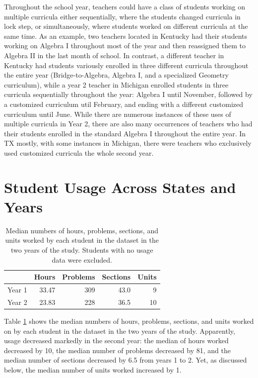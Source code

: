 \documentclass[12pt]{article}\usepackage[]{graphicx}\usepackage[]{color}
\begin{document}
Throughout the school year, teachers could have a class of students
working on multiple curricula either sequentially, where the students
changed curricula in lock step, or simultaneously, where students
worked on different curricula at the same time. As an example, two
teachers located in Kentucky had their students working on Algebra I
throughout most of the year and then reassigned them to Algebra II in
the last month of school. In contrast, a different teacher in Kentucky had students variously
enrolled in three different curricula throughout the entire year
(Bridge-to-Algebra, Algebra I, and a specialized Geometry curriculum),
while a year 2 teacher in Michigan enrolled students in
three curricula sequentially throughout the year: Algebra I
until November, followed by a customized curriculum util February, and
ending with a different customized curriculum until June. While there are numerous instances of these
uses of multiple curricula in Year 2, there are also many occurrences
of teachers who had their students enrolled in the standard Algebra I
throughout the entire year.  In TX mostly, with some instances in Michigan,
there were teachers who exclusively used customized curricula the
whole second year.

\section{Student Usage Across States and Years}\label{sec:usage}

\begin{table}[ht]
\centering
\begin{tabular}{rrrrr}
  \hline
 & Hours & Problems & Sections & Units \\ 
  \hline
Year 1 & 33.47 & 309 & 43.0 & 9 \\ 
  Year 2 & 23.83 & 228 & 36.5 & 10 \\ 
   \hline
\end{tabular}
\caption{Median numbers of hours, problems, sections, and units worked by each student in the dataset in the two years of the study. Students with no usage data were excluded.} 
\label{tab:medUsage}
\end{table}



Table \ref{tab:medUsage} shows the median numbers of hours,
problems, sections, and units worked on by each student in the dataset
in the two years of the study.
Apparently, usage decreased markedly in the second year: the median
of hours worked decreased by
10, the median number of problems decreased by
81, and
the median number of sections decreased by
6.5 from
years 1 to 2.
Yet, as discussed below, the median number of units worked increased
by 1.
\end{document}
